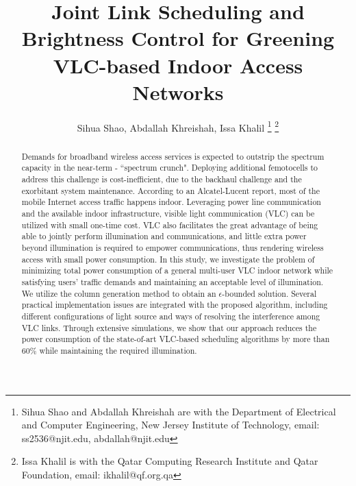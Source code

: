 \documentclass[10pt,journal]{IEEEtran}
\begin{document}
\title{Joint Link Scheduling and Brightness Control for Greening VLC-based Indoor Access Networks}

\author{Sihua Shao, Abdallah Khreishah, Issa Khalil
\thanks{Sihua Shao and Abdallah Khreishah are with the Department of Electrical and Computer Engineering,
New Jersey Institute of Technology, email: ss2536@njit.edu, abdallah@njit.edu}
\thanks{Issa Khalil is with the Qatar Computing Research Institute and Qatar Foundation, email: ikhalil@qf.org.qa}\vspace{-20pt}}

\maketitle

\begin{abstract}
Demands for broadband wireless access services is expected to outstrip the spectrum capacity in the near-term - ``spectrum crunch". Deploying additional femotocells to address this challenge is cost-inefficient, due to the backhaul challenge and the exorbitant system maintenance. According to an Alcatel-Lucent report, most of the mobile Internet access traffic happens indoor. Leveraging power line communication and the available indoor infrastructure, visible light communication (VLC) can be utilized with small one-time cost. VLC also facilitates the great advantage of being able to jointly perform illumination and communications, and little extra power beyond illumination is required to empower communications, thus rendering wireless access with small power consumption. In this study, we investigate the problem of minimizing total power consumption of a general multi-user VLC indoor network while satisfying users' traffic demands and maintaining an acceptable level of illumination. We utilize the column generation method to obtain an $\epsilon$-bounded solution. Several practical implementation issues are integrated with the proposed algorithm, including different configurations of light source and ways of resolving the interference among VLC links. Through extensive simulations, we show that our approach reduces the power consumption of the state-of-art VLC-based scheduling algorithms by more than 60\% while maintaining the required illumination.

\end{abstract}
\end{document}
